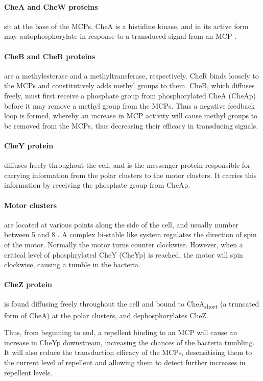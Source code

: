 \documentclass[../main.tex]{subfiles}
\begin{document}
\paragraph{CheA and CheW proteins} sit at the base of the MCPs. CheA is a histidine kinase, and in its active form may autophosphorylate in response to a transduced signal from an MCP \citep{sourjik10}.

\paragraph{CheB and CheR proteins} are a methylesterase and a methyltransferase, respectively. CheR binds loosely to the MCPs and constitutively adds methyl groups to them. CheB, which diffuses freely, must first receive a phosphate group from phosphorylated CheA (CheAp) before it may remove a methyl group from the MCPs. Thus a negative feedback loop is formed, whereby an increase in MCP activity will cause methyl groups to be removed from the MCPs, thus decreasing their efficacy in transducing signals.

\paragraph{CheY protein} diffuses freely throughout the cell, and is the messenger protein responsible for carrying information from the polar clusters to the motor clusters. It carries this information by receiving the phosphate group from CheAp.

\paragraph{Motor clusters} are located at various points along the side of the cell, and usually number between 5 and 8 \citep{wadhams04}. A complex bi-stable like system regulates the direction of spin of the motor. Normally the motor turns counter clockwise. However, when a critical level of phosphrylated CheY (CheYp) is reached, the motor will spin clockwise, causing a tumble in the bacteria.

\paragraph{CheZ protein} is found diffusing freely throughout the cell and bound to CheA\textsubscript{short} (a truncated form of CheA) at the polar clusters, and dephosphorylates CheZ.

Thus, from beginning to end, a repellent binding to an MCP will cause an increase in CheYp downstream, increasing the chances of the bacteria tumbling. It will also reduce the transduction efficacy of the MCPs, desensitising them to the current level of repellent and allowing them to detect further increases in repellent levels.
\end{document}
